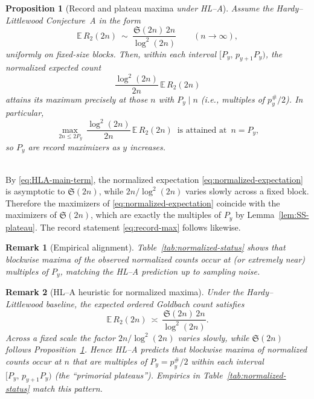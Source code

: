 \documentclass[11pt]{article}
\makeatletter
\theoremstyle{inline}
\newtheorem*{remark}{Remark}
\theoremstyle{break}
\renewenvironment{proof}[1][\proofname]{%
  \par\pushQED{\qed}%
  \normalfont \topsep6\p@\@plus6\p@\relax
  \trivlist
  \item[\hskip\labelsep
        \itshape
    #1\@addpunct{.}]\mbox{}\\  %
}{%
  \popQED\endtrivlist\@endpefalse
}
\theoremstyle{break}
\theoremstyle{break}
\theoremstyle{break}
\newtheorem{proposition}{Proposition}
\theoremstyle{break}
\theoremstyle{break}
\theoremstyle{break}
\theoremstyle{inline}
\makeatother
\begin{document}
\begin{proposition}[Record and plateau maxima \emph{under HL–A}]\label{prop:primorial-plateau}
Assume the Hardy–Littlewood Conjecture~A in the form
\begin{equation}\label{eq:HLA-main-term}
\mathbb E\,R_2(2n)\ \sim\ \frac{\mathfrak S(2n)\,2n}{\log^2(2n)}\qquad(n\to\infty),
\end{equation}
uniformly on fixed-size blocks. Then, within each interval $[P_y,\,p_{y+1}P_y)$, the \emph{normalized} expected count
\begin{equation}\label{eq:normalized-expectation}
\frac{\log^2(2n)}{2n}\,\mathbb E\,R_2(2n)
\end{equation}
attains its maximum precisely at those $n$ with $P_y\mid n$ (i.e., multiples of $p_y^\#/2$). In particular,
\begin{equation}\label{eq:record-max}
\max_{\,2n\le 2P_y}\ \frac{\log^2(2n)}{2n}\,\mathbb E\,R_2(2n)
\ \text{ is attained at }\, n=P_y,
\end{equation}
so $P_y$ are record maximizers as $y$ increases.
\end{proposition}

\begin{proof}
By \eqref{eq:HLA-main-term}, the normalized expectation \eqref{eq:normalized-expectation} is asymptotic to $\mathfrak S(2n)$, while $2n/\log^2(2n)$ varies slowly across a fixed block. Therefore the maximizers of \eqref{eq:normalized-expectation} coincide with the maximizers of $\mathfrak S(2n)$, which are exactly the multiples of $P_y$ by Lemma~\ref{lem:SS-plateau}. The record statement \eqref{eq:record-max} follows likewise.
\end{proof}

\begin{remark}[Empirical alignment]
Table~\ref{tab:normalized-status} shows that blockwise maxima of the observed normalized counts occur at (or extremely near) multiples of $P_y$, matching the HL–A prediction up to sampling noise.
\end{remark}

\begin{remark}[HL–A heuristic for normalized maxima]
Under the Hardy–Littlewood baseline, the expected ordered Goldbach count satisfies
\begin{equation}\label{eq:HLA-main-term}
\mathbb E\,R_2(2n)\ \asymp\ \frac{\mathfrak S(2n)\,2n}{\log^2(2n)}.
\end{equation}
Across a fixed scale the factor \(2n/\log^2(2n)\) varies slowly, while \(\mathfrak S(2n)\) follows Proposition~\ref{prop:primorial-plateau}. Hence HL–A predicts that \emph{blockwise maxima} of normalized counts occur at \(n\) that are multiples of \(P_y=p_y^\#/2\) within each interval \([P_y,\,p_{y+1}P_y)\) (the “primorial plateaus”). Empirics in Table~\ref{tab:normalized-status} match this pattern.
\end{remark}
\end{document}
